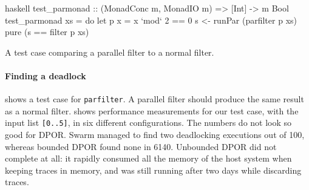 \begin{listing}
\centering
\begin{cminted}{haskell}
test_parmonad :: (MonadConc m, MonadIO m) => [Int] -> m Bool
test_parmonad xs = do
    let p x = x `mod` 2 == 0
    s <- runPar (parfilter p xs)
    pure (s == filter p xs)
\end{cminted}
\caption{A test case comparing a parallel filter to a normal filter.}\label{lst:parmonad_example2}
\end{listing}

\paragraph{Finding a deadlock}
 shows a test case for \verb|parfilter|.
A parallel filter should produce the same result as a normal filter.
 shows performance measurements for our test
case, with the input list \verb|[0..5]|, in six different
configurations.  The numbers do not look so good for DPOR.  Swarm
managed to find two deadlocking executions out of 100, whereas bounded
DPOR found none in 6140.  Unbounded DPOR did not complete at all: it
rapidly consumed all the memory of the host system when keeping traces
in memory, and was still running after two days while discarding
traces.

